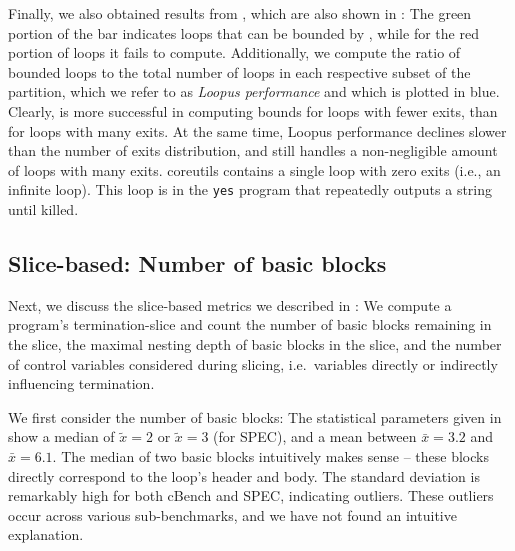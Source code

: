     Finally, we also obtained results from \loopus{}, which are also shown in : The green portion of the bar indicates loops that can be bounded by \loopus{}, while for the red portion of loops it fails to compute. Additionally, we compute the ratio of bounded loops to the total number of loops in each respective subset of the partition, which we refer to as \emph{Loopus performance} and which is plotted in blue. Clearly, \loopus{} is more successful in computing bounds for loops with fewer exits, than for loops with many exits. At the same time, Loopus performance declines slower than the number of exits distribution, and \loopus{} still handles a non-negligible amount of loops with many exits. coreutils contains a single loop with zero exits (i.e., an infinite loop). This loop is in the \texttt{yes} program that repeatedly outputs a string until killed.



    \def \plotcutarrow {->}
    \def \plotlessdetail {y}
    \def \plotcutarrow {-}

\subsection{Slice-based: Number of basic blocks}

    Next, we discuss the slice-based metrics we described in : We compute a program's termination-slice and count the number of basic blocks remaining in the slice, the maximal nesting depth of basic blocks in the slice, and the number of control variables considered during slicing, i.e.\ variables directly or indirectly influencing termination.

    We first consider the number of basic blocks: The statistical parameters given in  show a median of $\tilde{x} = 2$ or $\tilde{x} = 3$ (for SPEC), and a mean between $\bar{x} = 3.2$ and $\bar{x} = 6.1$. The median of two basic blocks intuitively makes sense -- these blocks directly correspond to the loop's header and body. The standard deviation is remarkably high for both cBench and SPEC, indicating outliers. These outliers occur across various sub-benchmarks, and we have not found an intuitive explanation.

